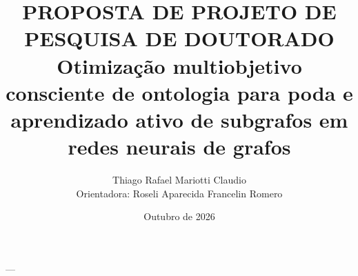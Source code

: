 \documentclass[11pt]{article}
\begin{document}
\title{PROPOSTA DE PROJETO DE PESQUISA DE DOUTORADO \\[1em]
Otimização multiobjetivo consciente de ontologia para poda e aprendizado ativo de subgrafos em redes neurais de grafos}

\author{Thiago Rafael Mariotti Claudio\\
Orientadora: Roseli Aparecida Francelin Romero
}

\date{Outubro de 2026}
\maketitle

\noindent 

---








\renewcommand{\refname}{Referências Bibliográficas}


\end{document}

